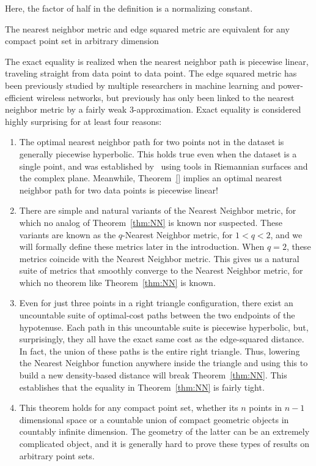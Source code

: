 Here, the factor of half in the definition is a normalizing constant.

\begin{theorem}\label{thm:NN} The nearest neighbor metric and edge squared
metric are equivalent for any compact point set in arbitrary dimension
\end{theorem}

The exact equality is realized when the nearest neighbor path is piecewise
linear, traveling straight from data point to data point. The edge squared
metric has been previously studied by multiple researchers in machine
learning and power-efficient wireless networks, but previously has only
been linked to the nearest neighbor metric by a fairly weak
3-approximation. Exact equality is considered highly surprising for at
least four reasons:

\begin{enumerate}

\item The optimal nearest neighbor path for two points not in the dataset
is generally piecewise hyperbolic. This holds true even when the
dataset is a single point, and was established by~\cite{}
using tools in Riemannian surfaces and the complex plane.
Meanwhile, Theorem~\ref{} implies an optimal nearest
neighbor path for two data points is piecewise linear!

\item There are simple and natural variants of the Nearest Neighbor metric,
for which no analog of Theorem~\ref{thm:NN} is known nor suspected.
These variants are known as the $q$-Nearest Neighbor
metric, for $1 < q < 2$, and we will formally define these
metrics later in the introduction. When $q=2$, these
metrics coincide with the Nearest Neighbor metric.
This
gives us a natural suite of metrics that smoothly converge
to the Nearest Neighbor metric, for which no theorem like
Theorem~\ref{thm:NN} is known.

\item Even for just three points in a right triangle configuration, there
exist an uncountable suite of optimal-cost paths between the two
endpoints of the hypotenuse. Each path in this uncountable
suite is piecewise hyperbolic, but, surprisingly, they all
have the exact same cost as the edge-squared distance. In
fact, the union of these paths is the entire right
triangle. Thus, lowering the Nearest Neighbor function
anywhere inside the triangle and using this to build a new
density-based distance will break
Theorem~\ref{thm:NN}. This establishes that the equality in
Theorem~\ref{thm:NN} is fairly tight.

\item This theorem holds for any compact point set, whether its $n$ points
in $n-1$ dimensional space or a countable union of compact geometric
objects in countably infinite dimension. The geometry of the latter can be
an extremely complicated object, and it is generally hard to prove
these types of results on arbitrary point sets.

\end{enumerate}


